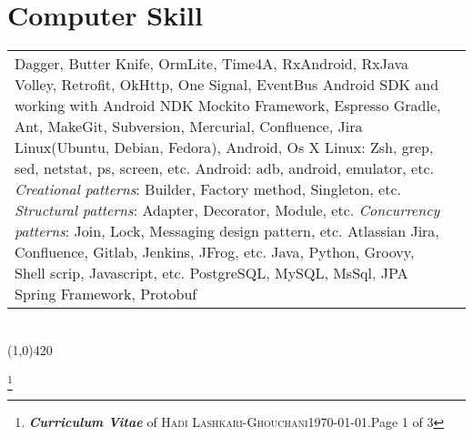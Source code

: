 \documentclass[10pt]{article}
\newcommand{\maxpages}{3}
\newcommand{\maxpages}{3}
\newcommand\HRule{\hspace*{.8cm}\line(1,0){420}\\}
\newenvironment{Record}[1]
{
    \vspace{-0.35cm}
    \section*{#1}
        \vspace{0.1cm}
        \begin{tabular}
}
{
        \end{tabular}\\
        \HRule
}
\newcommand{\FootNote}[1]{\let\thefootnote\relax\footnote{\textbf{\textit{Curriculum Vitae}} of \textsc{Hadi Lashkari-Ghouchani}\qquad\today.\qquad Page #1 of \maxpages}}
\begin{document}
\begin{Record}{Computer Skill}{l l}
    \ComputerSkill{Android Library}
        {Dagger, Butter Knife, OrmLite, Time4A, RxAndroid, RxJava}
        {Volley, Retrofit, OkHttp, One Signal, EventBus}
        {Android SDK and working with Android NDK}{}{}%
    \ComputerSkill{Android Test Library}
        {Mockito Framework, Espresso}{}{}{}{}%
    \ComputerSkill{Tool}
        {Gradle, Ant, Make}{Git, Subversion, Mercurial, Confluence, Jira}{}{}{}%
    \ComputerSkill{Operating System}
        {Linux(Ubuntu, Debian, Fedora), Android, Os X}{}{}{}{}%
    \ComputerSkill{Operating System tools}
        {Linux: Zsh, grep, sed, netstat, ps, screen, etc.}
        {Android: adb, android, emulator, etc.}{}{}{}%
    \ComputerSkill{Software Design Pattern}
        {\textit{Creational patterns}: Builder, Factory method, Singleton, etc.}
        {\textit{Structural patterns}: Adapter, Decorator, Module, etc.}
        {\textit{Concurrency patterns}: Join, Lock, Messaging design pattern, etc.}{}{}%
    \ComputerSkill{Development tools}
        {Atlassian Jira, Confluence, Gitlab, Jenkins, JFrog, etc.}{}{}{}{}%
    \ComputerSkill{Language}
        {Java, Python, Groovy, Shell scrip, Javascript, etc.}
        {}{}{}{}%
    \ComputerSkill{Back-End Development}
        {PostgreSQL, MySQL, MsSql, JPA}
        {Spring Framework, Protobuf}
        {}{}{}%
\end{Record}


\FootNote{1}

\end{document}
